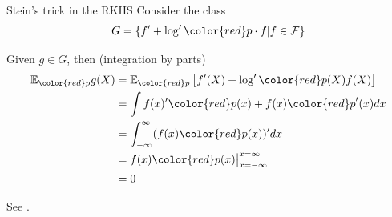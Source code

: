 \documentclass{beamer}
\begin{document}
  \begin{frame}{Stein's trick in the RKHS}
Consider the  class \large
$$G = \{ f'  +  \log' { \color{red} p} \cdot  f | f \in \mathcal{F} \}$$
\normalsize

\pause

Given $g\in G$, then (integration by parts)
\begin{align*}
\ev_{\color{red} p} g(X) &=
\ev_{\color{red} p} \left[ f'(X)  +  \log' {\color{red} p}(X) f(X) \right] \\
&= \int   f(x)' { \color{red} p}(x)   + f(x){\color{red} p}'(x) dx \\
&= \int_{-\infty}^{\infty} (f(x) {\color{red} p}(x) )'  dx \\
&= f(x) {\color{red} p}(x)  \big|_{x=-\infty}^{x=\infty} \\
&= 0
\end{align*}

\scriptsize
See  \cite{gorham2015measuring,OatGirCho15}.
\normalsize
 \end{frame} 

   
\end{document}
